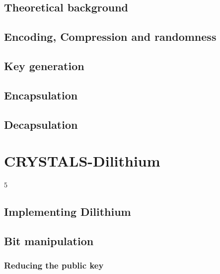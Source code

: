 \section{Theoretical background}
\label{sec:kyber_theroteical}


\section{Encoding, Compression and randomness}
\label{sec:kyber_enc_compr}


\section{Key generation}
\label{sec:kyber_keygen}


\section{Encapsulation}
\label{sec:kyber_enc}


\section{Decapsulation}
\label{sec:kyber_dec}


\chapter{CRYSTALS-Dilithium}
\label{ch:dilithium}
5

\section{Implementing Dilithium}
\label{sec:implementing_dil}


\section{Bit manipulation}
\label{sec:dil_bit_man}


\subsection{Reducing the public key}
\label{subsec:dil_reducing_pub_key}


